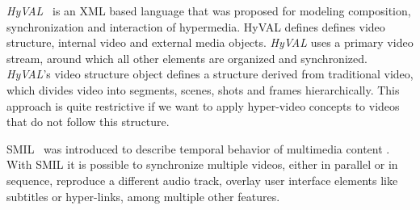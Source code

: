 \documentclass[10pt,conference]{IEEEtran}
\begin{document}
\emph{HyVAL}~\cite{hyval} is an \gls{XML} based language that was proposed for modeling composition, synchronization and interaction of hypermedia. 
HyVAL defines defines video structure, internal video and external media objects. 
\emph{HyVAL} uses a primary video stream, around which all other elements are organized and synchronized.
\emph{HyVAL}'s video structure object defines a structure derived from traditional video, which divides video into segments, scenes, shots and frames hierarchically. 
  This approach is quite restrictive if we want to apply hyper-video concepts to videos that do not follow this structure. 

  \gls{SMIL}~\cite{smil} was introduced to describe temporal behavior of multimedia content%
  . 
With \gls{SMIL} it is possible to synchronize multiple videos, either in parallel or in sequence, reproduce a different audio track, overlay user interface elements like subtitles or hyper-links, among multiple other features.




  
\end{document}
